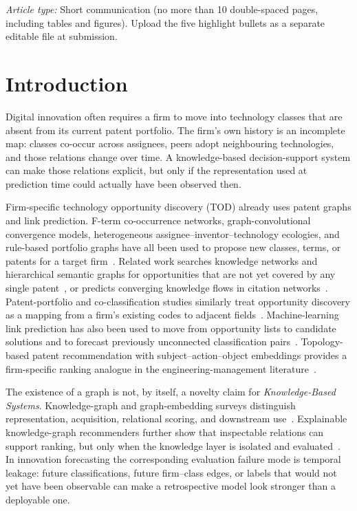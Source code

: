 \documentclass[preprint,12pt,3p]{elsarticle}
\begin{document}
\noindent\textit{Article type:} Short communication (no more than 10 double-spaced pages, including tables and figures). Upload the five highlight bullets as a separate editable file at submission.

\section{Introduction}
\label{sec:intro}
Digital innovation often requires a firm to move into technology classes that are absent from its current patent portfolio. The firm's own history is an incomplete map: classes co-occur across assignees, peers adopt neighbouring technologies, and those relations change over time. A knowledge-based decision-support system can make those relations explicit, but only if the representation used at prediction time could actually have been observed then.

Firm-specific technology opportunity discovery (TOD) already uses patent graphs and link prediction. F-term co-occurrence networks, graph-convolutional convergence models, heterogeneous assignee--inventor--technology ecologies, and rule-based portfolio graphs have all been used to propose new classes, terms, or patents for a target firm~\cite{lee2021,park2022,choi2023,seol2023,wu2023,wu2026,zhao2025}. Related work searches knowledge networks and hierarchical semantic graphs for opportunities that are not yet covered by any single patent~\cite{liu2023techno,ren2021}, or predicts converging knowledge flows in citation networks~\cite{park2018}. Patent-portfolio and co-classification studies similarly treat opportunity discovery as a mapping from a firm's existing codes to adjacent fields~\cite{shi2019,wang2018su,feng2020,yi2025}. Machine-learning link prediction has also been used to move from opportunity lists to candidate solutions and to forecast previously unconnected classification pairs~\cite{wang2024aei,geum2020,liu2023tfsc,zhao2026}. Topology-based patent recommendation with subject--action--object embeddings provides a firm-specific ranking analogue in the engineering-management literature~\cite{liu2025ieee}.

The existence of a graph is not, by itself, a novelty claim for \emph{Knowledge-Based Systems}. Knowledge-graph and graph-embedding surveys distinguish representation, acquisition, relational scoring, and downstream use~\cite{wang2017ieee,ji2022,nickel2016,cai2018,goyal2018}. Explainable knowledge-graph recommenders further show that inspectable relations can support ranking, but only when the knowledge layer is isolated and evaluated~\cite{yang2020,shimizu2022}. In innovation forecasting the corresponding evaluation failure mode is temporal leakage: future classifications, future firm--class edges, or labels that would not yet have been observable can make a retrospective model look stronger than a deployable one.
\end{document}
